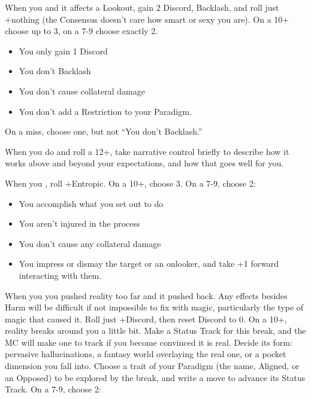 \begin{multicols}{3}
  \SEPARATOR

  \begin{move}
    When you  and it affects a Lookout, gain 2 Discord, Backlash, and roll just +nothing (the Consensus doesn’t care how smart or sexy you are). On a 10+ choose up to 3, on a 7-9 choose exactly 2. 

    \begin{itemize}
      \setlength\itemsep{0em}
    \item You only gain 1 Discord
    \item You don’t Backlash
    \item You don’t cause collateral damage
    \item You don’t add a Restriction to your Paradigm. 
    \end{itemize}
On a miss, choose one, but not “You don’t Backlash.”

  \end{move}

  \SEPARATOR

  \begin{move}
    When you do  and roll a 12+, take narrative control briefly to describe how it works above and beyond your expectations, and how that goes well for you.

  \end{move}

  \columnbreak
  
  \begin{move}
     When you , roll +Entropic. On a 10+, choose 3. On a 7-9, choose 2:

    \begin{itemize}
      \setlength\itemsep{0em}
    \item You accomplish what you set out to do
    \item You aren’t injured in the process
    \item You don’t cause any collateral damage
    \item You impress or dismay the target or an onlooker, and take +1 forward interacting with them.
    \end{itemize}
  \end{move}

  \SEPARATOR

  \begin{move}
    When you  you pushed reality too far and it pushed back. Any effects besides Harm will be difficult if not impossible to fix with magic, particularly the type of magic that caused it. Roll just +Discord, then reset Discord to 0. On a 10+, reality breaks around you a little bit. Make a Status Track for this break, and the MC will make one to track if you become convinced it is real. Decide its form: pervasive hallucinations, a fantasy world overlaying the real one, or a pocket dimension you fall into. Choose a trait of your Paradigm (the name, Aligned, or an Opposed) to be explored by the break, and write a move to advance its Status Track. 
On a 7-9, choose 2:


\end{move}
\end{multicols}
